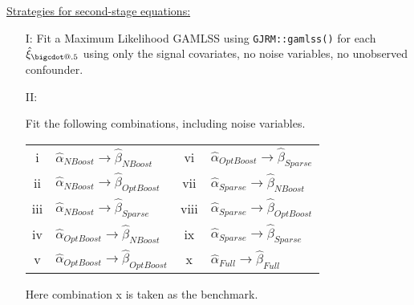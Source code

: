 \documentclass[12pt]{article}
\makeatletter
\newcommand*\bigcdot{\mathpalette\bigcdot@{.5}}
\newcommand*\bigcdot@[2]{\mathbin{\vcenter{\hbox{\scalebox{#2}{$\m@th#1\bullet$}}}}}
\makeatother
\begin{document}
\underline{Strategies for second-stage equations:}
\begin{itemize}
\item[I:]{Fit a Maximum Likelihood GAMLSS using \texttt{GJRM::gamlss()} for each $\hat{\xi}_{\bigcdot}$ using only the signal covariates, no noise variables, no unobserved confounder.}
 \item[II:]{Fit the following combinations, including noise variables.
\begin{table}[h!]
\centering
\begin{tabular}{cl|cl}
\toprule
\rowcolor{LightCyan}
i & $\hat{\alpha}_{NBoost} \rightarrow \hat{\beta}_{NBoost}$ & vi & $\hat{\alpha}_{OptBoost} \rightarrow \hat{\beta}_{Sparse}$ \\
ii & $\hat{\alpha}_{NBoost} \rightarrow \hat{\beta}_{OptBoost}$ & vii & $\hat{\alpha}_{Sparse} \rightarrow \hat{\beta}_{NBoost}$  \\
\rowcolor{LightCyan}
iii & $\hat{\alpha}_{NBoost} \rightarrow \hat{\beta}_{Sparse}$  & viii & $\hat{\alpha}_{Sparse} \rightarrow \hat{\beta}_{OptBoost}$ \\
iv & $\hat{\alpha}_{OptBoost} \rightarrow \hat{\beta}_{NBoost}$  & ix &  $\hat{\alpha}_{Sparse} \rightarrow \hat{\beta}_{Sparse}$ \\
\rowcolor{LightCyan}
v & $\hat{\alpha}_{OptBoost} \rightarrow \hat{\beta}_{OptBoost}$  & x & $\hat{\alpha}_{Full} \rightarrow \hat{\beta}_{Full}$  \\
\bottomrule
\end{tabular}
\end{table} 
 
Here combination x is taken as the benchmark.
 }
\end{itemize}
\end{document}
